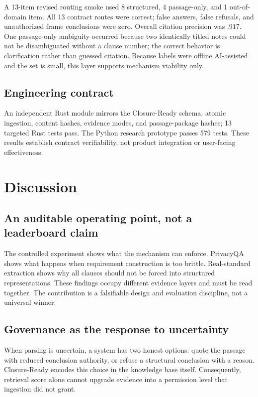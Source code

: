 \documentclass[11pt]{article}
\begin{document}
A 13-item revised routing smoke used 8 structured, 4 passage-only, and 1 out-of-domain item. All 13 contract routes were correct; false answers, false refusals, and unauthorized frame conclusions were zero. Overall citation precision was $.917$. One passage-only ambiguity occurred because two identically titled notes could not be disambiguated without a clause number; the correct behavior is clarification rather than guessed citation. Because labels were offline AI-assisted and the set is small, this layer supports mechanism viability only.

\subsection{Engineering contract}

An independent Rust module mirrors the Closure-Ready schema, atomic ingestion, content hashes, evidence modes, and passage-package hashes; 13 targeted Rust tests pass. The Python research prototype passes 579 tests. These results establish contract verifiability, not product integration or user-facing effectiveness.

\section{Discussion}
\label{sec:discussion}

\subsection{An auditable operating point, not a leaderboard claim}

The controlled experiment shows what the mechanism can enforce. PrivacyQA shows what happens when requirement construction is too brittle. Real-standard extraction shows why all clauses should not be forced into structured representations. These findings occupy different evidence layers and must be read together. The contribution is a falsifiable design and evaluation discipline, not a universal winner.

\subsection{Governance as the response to uncertainty}

When parsing is uncertain, a system has two honest options: quote the passage with reduced conclusion authority, or refuse a structural conclusion with a reason. Closure-Ready encodes this choice in the knowledge base itself. Consequently, retrieval score alone cannot upgrade evidence into a permission level that ingestion did not grant.
\end{document}
